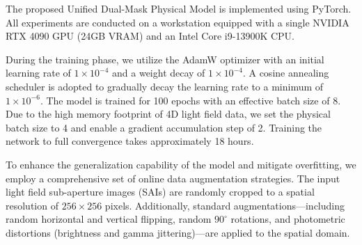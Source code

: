 \documentclass[lettersize,journal]{IEEEtran}
\begin{document}
\begin{table}[htbp]
  \centering
  \caption{Summary of benchmark datasets utilized for evaluating the proposed non-Lambertian light field depth estimation framework.}
  \label{tab:datasets_summary}
\end{table}

The proposed Unified Dual-Mask Physical Model is implemented using PyTorch. All experiments are conducted on a workstation equipped with a single NVIDIA RTX 4090 GPU (24GB VRAM) and an Intel Core i9-13900K CPU. 

During the training phase, we utilize the AdamW optimizer with an initial learning rate of $1 \times 10^{-4}$ and a weight decay of $1 \times 10^{-4}$. A cosine annealing scheduler is adopted to gradually decay the learning rate to a minimum of $1 \times 10^{-6}$. The model is trained for 100 epochs with an effective batch size of 8. Due to the high memory footprint of 4D light field data, we set the physical batch size to 4 and enable a gradient accumulation step of 2. Training the network to full convergence takes approximately 18 hours. 

To enhance the generalization capability of the model and mitigate overfitting, we employ a comprehensive set of online data augmentation strategies. The input light field sub-aperture images (SAIs) are randomly cropped to a spatial resolution of $256 \times 256$ pixels. Additionally, standard augmentations—including random horizontal and vertical flipping, random $90^{\circ}$ rotations, and photometric distortions (brightness and gamma jittering)—are applied to the spatial domain.
\end{document}
